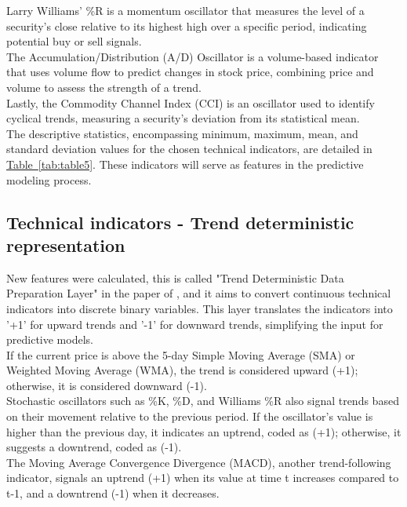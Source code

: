 \documentclass[aodsor,preprint]{imsart}
\numberwithin{equation}{section}
\theoremstyle{plain}
\begin{document}
Larry Williams' \%R is a momentum oscillator that measures the level of a security's close relative to its highest high over a specific period, indicating potential buy or sell signals.\\

The Accumulation/Distribution (A/D) Oscillator is a volume-based indicator that uses volume flow to predict changes in stock price, combining price and volume to assess the strength of a trend.\\

Lastly, the Commodity Channel Index (CCI) is an oscillator used to identify cyclical trends, measuring a security's deviation from its statistical mean.\\

The descriptive statistics, encompassing minimum, maximum, mean, and standard deviation values for the chosen technical indicators, are detailed in \hyperref[tab:table5]{Table~\ref*{tab:table5}}. These indicators will serve as features in the predictive modeling process.

\subsection{Technical indicators - Trend deterministic representation}

New features were calculated, this is called "Trend Deterministic Data Preparation Layer" in the paper of \cite{patel2015}, and it aims to convert continuous technical indicators into discrete binary variables. This layer translates the indicators into '+1' for upward trends and '-1' for downward trends, simplifying the input for predictive models.\\

If the current price is above the 5-day Simple Moving Average (SMA) or Weighted Moving Average (WMA), the trend is considered upward (+1); otherwise, it is considered downward (-1). \\

Stochastic oscillators such as \%K, \%D, and Williams \%R also signal trends based on their movement relative to the previous period. If the oscillator's value is higher than the previous day, it indicates an uptrend, coded as (+1); otherwise, it suggests a downtrend, coded as (-1). \\

The Moving Average Convergence Divergence (MACD), another trend-following indicator, signals an uptrend (+1) when its value at time t increases compared to t-1, and a downtrend (-1) when it decreases. \\
\end{document}
